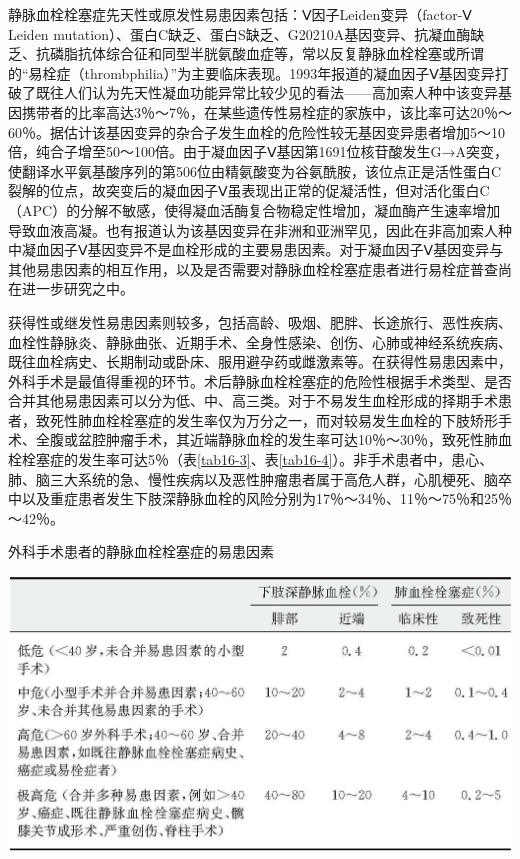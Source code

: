 静脉血栓栓塞症先天性或原发性易患因素包括：Ⅴ因子Leiden变异（factor-Ⅴ
Leiden
mutation）、蛋白C缺乏、蛋白S缺乏、G20210A基因变异、抗凝血酶缺乏、抗磷脂抗体综合征和同型半胱氨酸血症等，常以反复静脉血栓栓塞或所谓的“易栓症（thrombphilia）”为主要临床表现。1993年报道的凝血因子Ⅴ基因变异打破了既往人们认为先天性凝血功能异常比较少见的看法------高加索人种中该变异基因携带者的比率高达3％～7％，在某些遗传性易栓症的家族中，该比率可达20％～60％。据估计该基因变异的杂合子发生血栓的危险性较无基因变异患者增加5～10倍，纯合子增至50～100倍。由于凝血因子Ⅴ基因第1691位核苷酸发生G→A突变，使翻译水平氨基酸序列的第506位由精氨酸变为谷氨酰胺，该位点正是活性蛋白C裂解的位点，故突变后的凝血因子Ⅴ虽表现出正常的促凝活性，但对活化蛋白C（APC）的分解不敏感，使得凝血活酶复合物稳定性增加，凝血酶产生速率增加导致血液高凝。也有报道认为该基因变异在非洲和亚洲罕见，因此在非高加索人种中凝血因子Ⅴ基因变异不是血栓形成的主要易患因素。对于凝血因子Ⅴ基因变异与其他易患因素的相互作用，以及是否需要对静脉血栓栓塞症患者进行易栓症普查尚在进一步研究之中。

获得性或继发性易患因素则较多，包括高龄、吸烟、肥胖、长途旅行、恶性疾病、血栓性静脉炎、静脉曲张、近期手术、全身性感染、创伤、心肺或神经系统疾病、既往血栓病史、长期制动或卧床、服用避孕药或雌激素等。在获得性易患因素中，外科手术是最值得重视的环节。术后静脉血栓栓塞症的危险性根据手术类型、是否合并其他易患因素可以分为低、中、高三类。对于不易发生血栓形成的择期手术患者，致死性肺血栓栓塞症的发生率仅为万分之一，而对较易发生血栓的下肢矫形手术、全腹或盆腔肿瘤手术，其近端静脉血栓的发生率可达10％～30％，致死性肺血栓栓塞症的发生率可达5％（表\ref{tab16-3}、表\ref{tab16-4}）。非手术患者中，患心、肺、脑三大系统的急、慢性疾病以及恶性肿瘤患者属于高危人群，心肌梗死、脑卒中以及重症患者发生下肢深静脉血栓的风险分别为17％～34％、11％～75％和25％～42％。

\begin{table}[htbp]
\centering
\caption{外科手术患者的静脉血栓栓塞症的易患因素}
\label{tab16-3}
\includegraphics{./images/Image00118.jpg}
\end{table}

